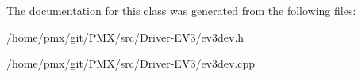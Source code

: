 The documentation for this class was generated from the following files\+:\begin{DoxyCompactItemize}
\item 
/home/pmx/git/\+P\+M\+X/src/\+Driver-\/\+E\+V3/ev3dev.\+h\item 
/home/pmx/git/\+P\+M\+X/src/\+Driver-\/\+E\+V3/ev3dev.\+cpp\end{DoxyCompactItemize}
